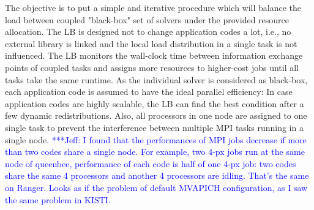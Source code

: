 \documentclass[preprint,12pt]{elsarticle}
\newcommand{\skonote}[1]{ {\textcolor{blue} { ***Jeff: #1 }}}
\newcommand{\skonote}[1]{}
\begin{document}
The objective is to put a simple and iterative procedure 
which will balance the load between coupled "black-box" set of solvers under the provided resource allocation.
The LB is designed not to change application codes a lot, i.e., no external library is linked and the local load distribution in a single task is not influenced. The LB monitors the wall-clock time between information exchange points of coupled tasks and assigns more resources to higher-cost jobs until all tasks take the same runtime. As the individual solver is considered as black-box, each application code is assumed to have the ideal parallel efficiency: In case application codes are highly scalable, the LB can find the best condition after a few dynamic redistributions. Also, all processors in one node are assigned to one single task to prevent the interference between multiple MPI tasks running in a single node.\skonote{I found that the performances of MPI jobs decrease if more than two codes share a single node. For example, two 4-px jobs run at the same node of queenbee, performance of each code is half of one 4-px job: two codes share the same 4 processors and another 4 processors are idling. That's the same on Ranger. Looks as if the problem of default MVAPICH configuration, as I saw the same problem in KISTI.}

\end{document}
